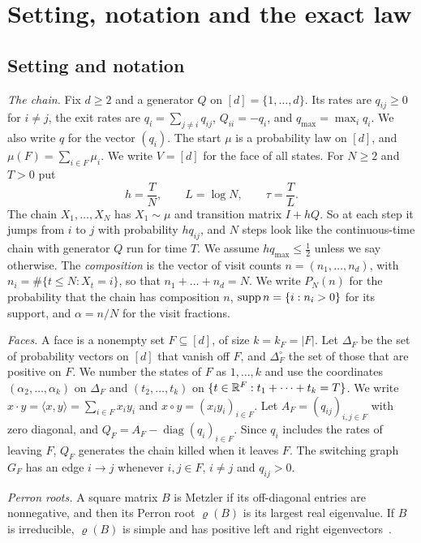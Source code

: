 \section{Setting, notation and the exact law}\label{sec:model}

\subsection{Setting and notation}\label{sec:notation}

\emph{The chain.} Fix $d\ge2$ and a generator $Q$ on $[d]=\{1,\dots,d\}$. Its
rates are $q_{ij}\ge0$ for $i\ne j$, the exit rates are $q_i=\sum_{j\ne i}q_{ij}$,
$Q_{ii}=-q_i$, and $q_{\max}=\max_iq_i$. We also write $q$ for the vector
$(q_i)$. The start $\mu$ is a probability law on $[d]$, and
$\mu(F)=\sum_{i\in F}\mu_i$. We write $V=[d]$ for the face of all states. For
$N\ge2$ and $T>0$ put
\[
 h=\frac TN,\qquad L=\log N,\qquad \tau=\frac TL .
\]
The chain $X_1,\dots,X_N$ has $X_1\sim\mu$ and transition matrix $I+hQ$. So at
each step it jumps from $i$ to $j$ with probability $hq_{ij}$, and $N$ steps
look like the continuous-time chain with generator $Q$ run for time $T$. We
assume $hq_{\max}\le\frac12$ unless we say otherwise. The \emph{composition} is
the vector of visit counts $n=(n_1,\dots,n_d)$, with
$n_i=\#\{t\le N:X_t=i\}$, so that $n_1+\dots+n_d=N$. We write $P_N(n)$ for the
probability that the chain has composition $n$, $\operatorname{supp} n=\{i:n_i>0\}$ for its
support, and $\alpha=n/N$ for the visit fractions.

\emph{Faces.} A face is a nonempty set $F\subseteq[d]$, of size
$k=k_F=\lvert F\rvert$. Let $\Delta_F$ be the set of probability vectors on
$[d]$ that vanish off $F$, and $\Delta_F^\circ$ the set of those that are
positive on $F$. We number the states of $F$ as $1,\dots,k$ and use the
coordinates $(\alpha_2,\dots,\alpha_k)$ on $\Delta_F$ and $(t_2,\dots,t_k)$ on
$\{t\in\mathbb{R}^F:t_1+\dots+t_k=T\}$. We write $x\cdot y=\langle x,y\rangle
=\sum_{i\in F}x_iy_i$ and $x\circ y=(x_iy_i)_{i\in F}$. Let
$A_F=(q_{ij})_{i,j\in F}$ with zero diagonal, and $Q_F=A_F-\operatorname{diag}
(q_i)_{i\in F}$. Since $q_i$ includes the rates of leaving $F$, $Q_F$ generates
the chain killed when it leaves $F$. The switching graph $G_F$ has an edge
$i\to j$ whenever $i,j\in F$, $i\ne j$ and $q_{ij}>0$.

\emph{Perron roots.} A square matrix $B$ is Metzler if its off-diagonal entries
are nonnegative, and then its Perron root $\varrho(B)$ is its largest real
eigenvalue.
If $B$ is irreducible, $\varrho(B)$ is simple and has positive left and right
eigenvectors~\cite{bermanplemmons1994}.

